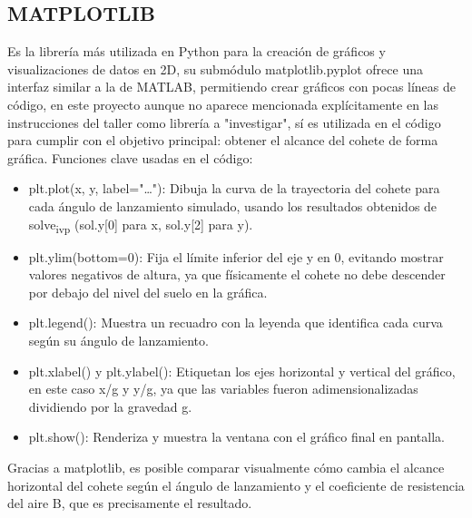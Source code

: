 \documentclass{article}
\begin{document}
\subsection{MATPLOTLIB}
\label{sec:org0d804c7}
Es la librería más utilizada en Python para la creación de gráficos y visualizaciones de datos en 2D, su submódulo matplotlib.pyplot ofrece una interfaz similar a la de MATLAB, permitiendo crear gráficos
con pocas líneas de código, en este proyecto aunque no aparece mencionada explícitamente en las instrucciones del taller como librería a "investigar", sí es utilizada en el código para cumplir
con el objetivo principal: obtener el alcance del cohete de forma gráfica.
Funciones clave usadas en el código:
\begin{itemize}
\item plt.plot(x, y, label="\ldots{}"): Dibuja la curva de la trayectoria del cohete para cada ángulo de lanzamiento simulado, usando los resultados obtenidos de solve\textsubscript{ivp} (sol.y[0] para x, sol.y[2] para y).
\item plt.ylim(bottom=0): Fija el límite inferior del eje y en 0, evitando mostrar valores negativos de altura, ya que físicamente el cohete no debe descender por debajo del nivel del suelo en la gráfica.
\item plt.legend(): Muestra un recuadro con la leyenda que identifica cada curva según su ángulo de lanzamiento.
\item plt.xlabel() y plt.ylabel(): Etiquetan los ejes horizontal y vertical del gráfico, en este caso x/g y y/g, ya que las variables fueron adimensionalizadas dividiendo por la gravedad g.
\item plt.show(): Renderiza y muestra la ventana con el gráfico final en pantalla.
\end{itemize}
Gracias a matplotlib, es posible comparar visualmente cómo cambia el alcance horizontal del cohete según el ángulo de lanzamiento y el coeficiente de resistencia del aire B, que es precisamente
el resultado.  
\end{document}
